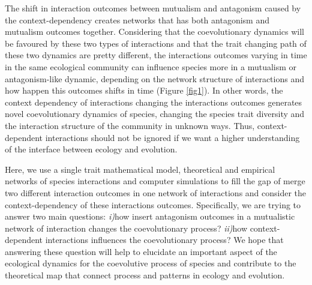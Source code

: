 \documentclass[a4paper, 12pt]{article}
\begin{document}
The shift in interaction outcomes between mutualism and antagonism caused by the context-dependency creates networks that has both antagonism and mutualism outcomes together. Considering that the coevolutionary dynamics will be favoured by these two types of interactions and that the trait changing path of these two dynamics are pretty different, the interactions outcomes varying in time in the same ecological community can influence species more in a mutualism or antagonism-like dynamic, depending on the network structure of interactions and how happen this outcomes shifts in time (Figure \ref{fig1}). In other words, the context dependency of interactions changing the interactions outcomes generates novel coevolutionary dynamics of species, changing the species trait diversity and the interaction structure of the community in unknown ways. Thus, context-dependent interactions should not be ignored if we want a higher understanding of the interface between ecology and evolution. 

Here, we use a single trait mathematical model, theoretical and empirical networks of species interactions and computer simulations to fill the gap of merge two different interaction outcomes in one network of interactions and consider the context-dependency of these interactions outcomes. Specifically, we are trying to answer two main questions: \textit{i)}how insert antagonism outcomes in a mutualistic network of interaction changes the coevolutionary process? \textit{ii)}how context-dependent interactions influences the coevolutionary process?  We hope that answering these question will help to elucidate an important aspect of the ecological dynamics for the coevolutive process of species and contribute to the theoretical map that connect process and patterns in ecology and evolution.
\end{document}

